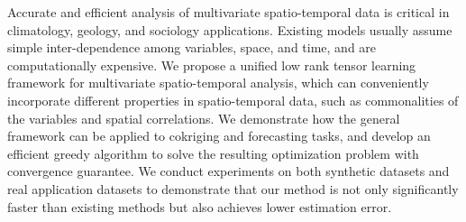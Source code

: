 Accurate and efficient analysis of multivariate spatio-temporal data is critical in climatology, geology, and sociology applications. Existing models usually assume simple inter-dependence among variables, space, and time, and are computationally expensive. We propose a unified low rank tensor learning framework for multivariate spatio-temporal analysis, which can conveniently incorporate different properties in spatio-temporal data, such as commonalities of the variables and spatial correlations.   We demonstrate how the general framework can be applied to cokriging and forecasting tasks, and develop an efficient greedy algorithm to solve the resulting optimization problem with convergence guarantee. We conduct experiments on both synthetic datasets and real application datasets to demonstrate that our method is not only significantly faster than existing methods but also achieves lower estimation error. 
